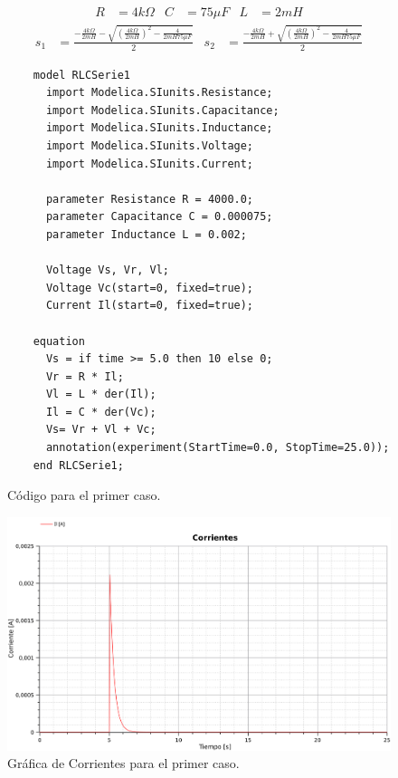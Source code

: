 

\begin{align*}
  R&=4k\Omega&
  C&=75\mu F&
  L&=2mH
\end{align*}
\begin{align*}
  s_1 &= \frac{-\frac{4k\Omega}{2mH}
  - \sqrt{\left(\frac{4k\Omega}{2mH}\right)^2-\frac{4}{2mH75\mu F}}}{2}
  &
  s_2 &= \frac{-\frac{4k\Omega}{2mH}
  + \sqrt{\left(\frac{4k\Omega}{2mH}\right)^2-\frac{4}{2mH75\mu F}}}{2}
\end{align*}


\begin{figure}[H]
  \begin{lstlisting}
    model RLCSerie1
      import Modelica.SIunits.Resistance;
      import Modelica.SIunits.Capacitance;
      import Modelica.SIunits.Inductance;
      import Modelica.SIunits.Voltage;
      import Modelica.SIunits.Current;

      parameter Resistance R = 4000.0;
      parameter Capacitance C = 0.000075;
      parameter Inductance L = 0.002;

      Voltage Vs, Vr, Vl;
      Voltage Vc(start=0, fixed=true);
      Current Il(start=0, fixed=true);

    equation
      Vs = if time >= 5.0 then 10 else 0;
      Vr = R * Il;
      Vl = L * der(Il);
      Il = C * der(Vc);
      Vs= Vr + Vl + Vc;
      annotation(experiment(StartTime=0.0, StopTime=25.0));
    end RLCSerie1;
  \end{lstlisting}
  \caption{Código para el primer caso.}
\end{figure}

\begin{figure}[H]
  \centering
  \label{gr:caso1:corrientes}
  \includegraphics[width=\textwidth]{modelica/graficas/1-corrientes}
  \caption{Gráfica de Corrientes para el primer caso.}
\end{figure}

